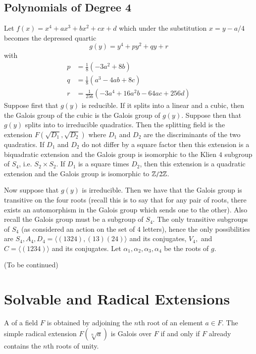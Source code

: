 \subsection{Polynomials of Degree 4}


Let $f(x) = x^4+ax^3+bx^2+cx+d$ which under the substitution $x = y-a/4$ becomes the depressed quartic \begin{equation*}
    g(y) = y^4 + py^2+qy+r
\end{equation*}
with \begin{align*}
    p &= \frac{1}{8}(-3a^2+8b) \\
    q &= \frac{1}{8}(a^3-4ab+8c) \\
    r &= \frac{1}{256}(-3a^4+16a^2b-64ac+256d)
\end{align*}
Suppose first that $g(y)$ is reducible. If it splits into a linear and a cubic, then the Galois group of the cubic is the Galois group of $g(y)$. Suppose then that $g(y)$ splits into to irreducible quadratics. Then the splitting field is the extension $F(\sqrt{D_1},\sqrt{D_2})$ where $D_1$ and $D_2$ are the discriminants of the two quadratics. If $D_1$ and $D_2$ do not differ by a square factor then this extension is a biquadratic extension and the Galois group is isomorphic to the Klien $4$ subgroup of $S_4$, i.e. $S_2 \times S_2$. If $D_1$ is a square times $D_2$, then this extension is a quadratic extension and the Galois group is isomorphic to $\mathbb Z/2\mathbb Z$.

Now suppose that $g(y)$ is irreducible. Then we have that the Galois group is transitive on the four roots (recall this is to say that for any pair of roots, there exists an automorphism in the Galois group which sends one to the other). Also recall the Galois group must be a subgroup of $S_4$. The only transitive subgroups of $S_4$ (as considered an action on the set of $4$ letters), hence the only possibilities are $S_4, A_4, D_4 = \langle (1324),(13)(24)\rangle$ and its conjugates, $V_4,$ and $C = \langle (1234)\rangle$ and its conjugates. Let $\alpha_1,\alpha_2,\alpha_3,\alpha_4$ be the roots of $g$. 

(To be continued)



\section{\textsection Solvable and Radical Extensions}


\begin{defn}
    A  of a field $F$ is obtained by adjoining the $n$th root of an element $a \in F$. The simple radical extension $F(\sqrt[n]{a})$ is Galois over $F$ if and only if $F$ already contains the $n$th roots of unity.
\end{defn}

